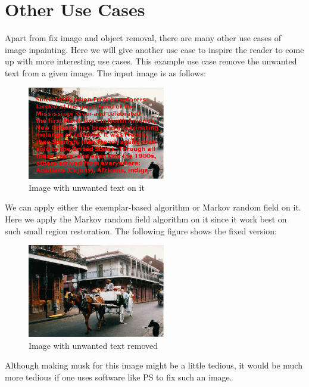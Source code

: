 \section{Other Use Cases}
Apart from fix image and object removal, there are many other use cases of image inpainting. Here we will give another use case to inspire the reader to come up with more interesting use cases. This example use case remove the unwanted text from a given image. The input image is as follows:
\begin{figure}[H]
\centering
\includegraphics[width=6cm]{hc.png}
\caption{Image with unwanted text on it}
\end{figure}
We can apply either the exemplar-based algorithm or Markov random field on it. Here we apply the Markov random field algorithm on it since it work best on such small region restoration. The following figure shows the fixed version:
\begin{figure}[H]
\centering
\includegraphics[width=6cm]{hc_res.png}
\caption{Image with unwanted text removed}
\end{figure}
Although making musk for this image might be a little tedious, it would be much more tedious if one uses software like PS to fix such an image.
